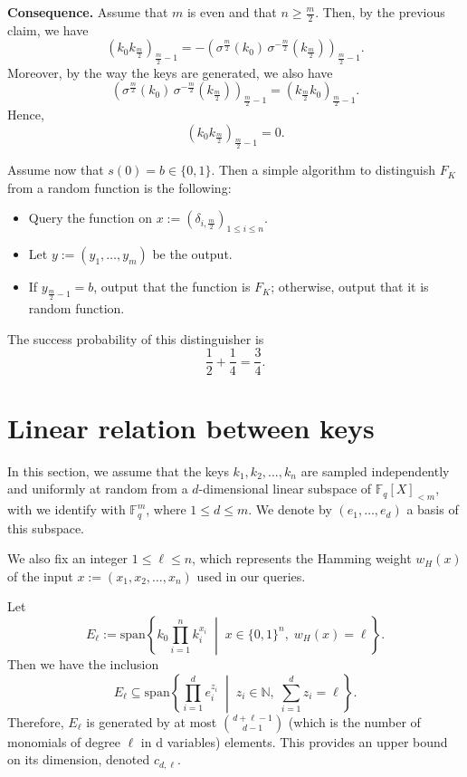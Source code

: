 \documentclass{article}
\begin{document}
\textbf{Consequence.}
Assume that $m$ is even and that $n \geq \frac{m}{2}$. Then, by the previous claim, we have
\[
(k_0 k_{\frac{m}{2}})_{\frac{m}{2}-1}
=
- \left( \sigma^{\frac{m}{2}}(k_0)\, \sigma^{-\frac{m}{2}}(k_{\frac{m}{2}}) \right)_{\frac{m}{2}-1}.
\]
Moreover, by the way the keys are generated, we also have
\[
 \left( \sigma^{\frac{m}{2}}(k_0)\, \sigma^{-\frac{m}{2}}(k_{\frac{m}{2}}) \right)_{\frac{m}{2}-1}
=
 (k_{\frac{m}{2}} k_0)_{\frac{m}{2}-1}.
\]
Hence,
\[
(k_0 k_{\frac{m}{2}})_{\frac{m}{2}-1} = 0.
\]

\medskip

Assume now that $s(0) = b \in \{0,1\}$. Then a simple algorithm to distinguish $F_K$ from a random function is the following:

\begin{itemize}
    \item Query the function on $x := (\delta_{i, \frac{m}{2}})_{1 \leq i \leq n}$.
    \item Let $y := (y_1, \dots, y_m)$ be the output.
    \item If $y_{\frac{m}{2}-1} = b$, output that the function is $F_K$; otherwise, output that it is random function.
\end{itemize}

The success probability of this distinguisher is
\[
\frac{1}{2} + \frac{1}{4} = \frac{3}{4}.
\]

\section{Linear relation between keys}
In this section, we assume that the keys $k_1, k_2, \dots, k_n$ are sampled independently and uniformly at random from a $d$-dimensional linear subspace of $\mathbb{F}_q[X]_{<m}$, with we identify with $\mathbb{F}_q^m$, where $1 \leq d \leq m$. We denote by $(e_1, \dots, e_d)$ a basis of this subspace.

We also fix an integer $1 \leq \ell \leq n$, which represents the Hamming weight $w_H(x)$ of the input $x := (x_1, x_2, \dots, x_n)$ used in our queries.

\medskip

Let
\[
E_\ell := \mathrm{span} \left\{ k_0 \prod_{i=1}^n k_i^{x_i} \;\middle|\; x \in \{0,1\}^n,\; w_H(x) = \ell \right\}.
\]
Then we have the inclusion
\[
E_\ell \subseteq \mathrm{span} \left\{ \prod_{i=1}^d e_i^{z_i} \;\middle|\; z_i \in \mathbb{N},\; \sum_{i=1}^d z_i = \ell \right\}.
\] Therefore, $E_\ell$ is generated by at most $\binom{d+\ell-1}{d -1}$ (which is the number of monomials of degree $\ell$ in d variables) elements. This provides an upper bound on its dimension, denoted $c_{d,\ell}$.
\end{document}
